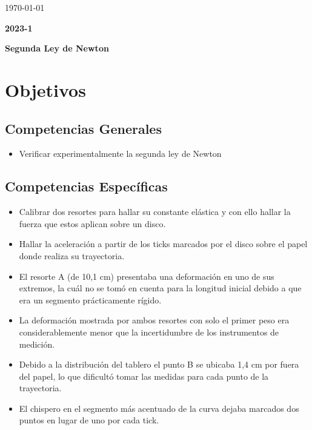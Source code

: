\documentclass[10pt]{article}
\begin{document}
\begin{center}
 \vspace{2.4cm}

\large{\today}\\
\vspace{0.3cm}

{ \Large\bfseries 2023-1}
										 			
\end{center}							 											
																					
\newpage																		

\tableofcontents 

\newpage

\begin{center}
    \textbf{\huge Segunda Ley de Newton}
\end{center}

\section{Objetivos}
\subsection{Competencias Generales}
\begin{itemize}
    \item Verificar experimentalmente la segunda ley de Newton
\end{itemize} 
\subsection{Competencias Específicas}
\begin{itemize}
    \item Calibrar dos resortes para hallar su constante elástica y con ello hallar la fuerza que estos aplican sobre un disco.
    \item Hallar la aceleración a partir de los ticks marcados por el disco sobre el papel donde realiza su trayectoria.
\end{itemize}


\begin{itemize}
    \item El resorte A (de 10,1 cm) presentaba una deformación en uno de sus extremos, la cuál no se tomó en cuenta para la longitud inicial debido a que era un segmento prácticamente rígido.
    \item La deformación mostrada por ambos resortes con solo el primer peso era considerablemente menor que la incertidumbre de los instrumentos de medición.
    \item Debido a la distribución del tablero el punto B se ubicaba 1,4 cm por fuera del papel, lo que dificultó tomar las medidas para cada punto de la trayectoria.
    \item El chispero en el segmento más acentuado de la curva dejaba marcados dos puntos en lugar de uno por cada tick.
\end{itemize}
\end{document}
